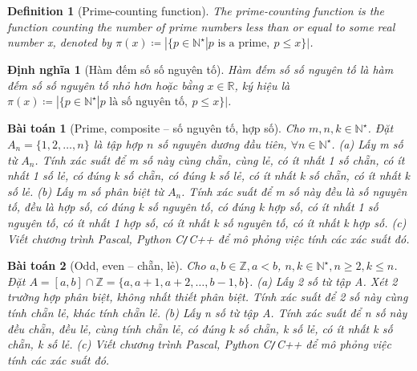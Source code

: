 \documentclass{article}
\newtheorem{baitoan}{Bài toán}
\newtheorem{definition}{Definition}
\newtheorem{dinhnghia}{Định nghĩa}
\begin{document}
\begin{definition}[Prime-counting function]
	The {\rm prime-counting function} is the function counting the number of prime numbers less than or equal to some real number x, denoted by $\pi(x)\coloneqq|\{p\in\mathbb{N}^\star|p \mbox{ is a prime},\ p\le x\}|$.
\end{definition}

\begin{dinhnghia}[Hàm đếm số số nguyên tố]
	{\rm Hàm đếm số số nguyên tố} là hàm đếm số số nguyên tố nhỏ hơn hoặc bằng $x\in\mathbb{R}$, ký hiệu là $\pi(x)\coloneqq|\{p\in\mathbb{N}^\star|p \mbox{ là số nguyên tố},\ p\le x\}|$.
\end{dinhnghia}

\begin{baitoan}[Prime, composite -- số nguyên tố, hợp số]
	Cho $m,n,k\in\mathbb{N}^\star$. Đặt $A_n = \{1,2,\ldots,n\}$ là tập hợp $n$ số nguyên dương đầu tiên, $\forall n\in\mathbb{N}^\star$. (a) Lấy m số từ $A_n$. Tính xác suất để m số này cùng chẵn, cùng lẻ, có ít nhất 1 số chẵn, có ít nhất 1 số lẻ, có đúng k số chẵn, có đúng k số lẻ, có ít nhất k số chẵn, có ít nhất k số lẻ. (b) Lấy m số phân biệt từ $A_n$. Tính xác suất để m số này đều là số nguyên tố, đều là hợp số, có đúng k số nguyên tố, có đúng k hợp số, có ít nhất 1 số nguyên tố, có ít nhất 1 hợp số, có ít nhất k số nguyên tố, có ít nhất k hợp số. (c) Viết chương trình {\sf Pascal, Python C{\tt/}C++} để mô phỏng việc tính các xác suất đó.
\end{baitoan}

\begin{baitoan}[Odd, even -- chẵn, lẻ]
	Cho $a,b\in\mathbb{Z},a < b$, $n,k\in\mathbb{N}^\star,n\ge2,k\le n$. Đặt $A = [a,b]\cap\mathbb{Z} = \{a,a + 1,a + 2,\ldots,b - 1,b\}$. (a) Lấy 2 số từ tập A. Xét 2 trường hợp phân biệt, không nhất thiết phân biệt. Tính xác suất để 2 số này cùng tính chẵn lẻ, khác tính chẵn lẻ. (b) Lấy n số từ tập A. Tính xác suất để n số này đều chẵn, đều lẻ, cùng tính chẵn lẻ, có đúng k số chẵn, k số lẻ, có ít nhất k số chẵn, k số lẻ. (c) Viết chương trình {\sf Pascal, Python C{\tt/}C++} để mô phỏng việc tính các xác suất đó.
\end{baitoan}
\end{document}
